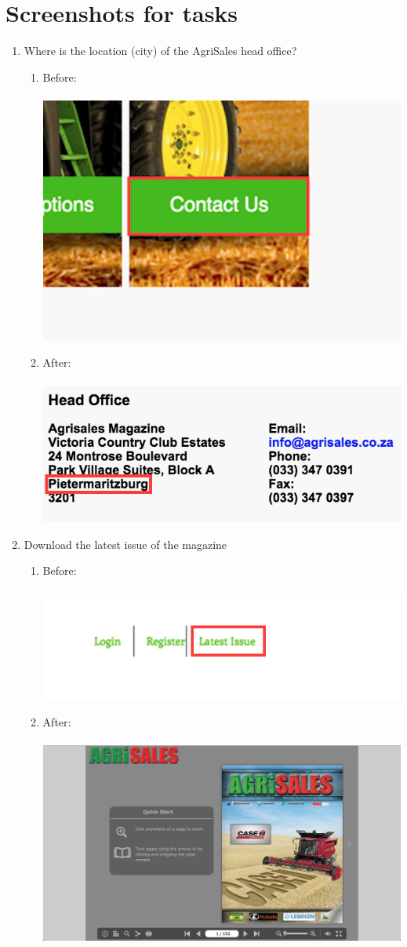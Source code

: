 \documentclass[11pt]{article}
\begin{document}
\newpage

\section{Screenshots for tasks}
	\begin{enumerate}
		
		\item Where is the location (city) of the AgriSales head office?
				\begin{enumerate}
					\item Before: \\ \\
						\includegraphics[width=0.3\linewidth]{../Images/Tasks/Task1Before}
					\item After: \\ \\
						\includegraphics[width=0.5\linewidth]{../Images/Tasks/Task1After}
				\end{enumerate}
				
		\item Download the latest issue of the magazine
			\begin{enumerate}
				\item Before: \\ \\
					\includegraphics[width=0.7\linewidth]{../Images/Tasks/Task2Before}
				\item After: \\ \\
					\includegraphics[width=0.5\linewidth]{../Images/Tasks/Task2After}
			\end{enumerate}


\end{enumerate}
\end{document}
